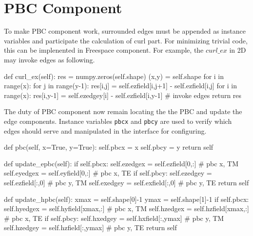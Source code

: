 \section{PBC Component}
To make PBC component work, surrounded edges must be appended as instance variables and participate the calculation of
curl part. For minimizing trivial code, this can be implenented in Freespace component. For example, the $curl\_ex$ in
2D may invoke edges as following.
\begin{code}
    def curl_ex(self):
        res = numpy.zeros(self.shape)
        (x,y) = self.shape
        for i in range(x):
            for j in range(y-1):
                res[i,j] = self.ezfield[i,j+1] - self.ezfield[i,j]
        for i in range(x):
            res[i,y-1] = self.ezedgey[i] - self.ezfield[i,y-1]  # invoke edges
        return res
\end{code}
The duty of PBC component now remain locating the the PBC and update the edge components. Instance variables
\texttt{pbcx} and \texttt{pbcy} are used to verify which edges should serve and manipulated in the interface for
configuring.
\begin{code}
    def pbc(self, x=True, y=True):
        self.pbcx = x
        self.pbcy = y
        return self

    def update_epbc(self):
        if self.pbcx:
            self.ezedgex = self.ezfield[0,:] # pbc x, TM
            self.eyedgex = self.eyfield[0,:] # pbc x, TE
        if self.pbcy:
            self.ezedgey = self.ezfield[:,0] # pbc y, TM
            self.exedgey = self.exfield[:,0] # pbc y, TE
        return self

    def update_hpbc(self):
        xmax = self.shape[0]-1
        ymax = self.shape[1]-1
        if self.pbcx:
            self.hyedgex = self.hyfield[xmax,:] # pbc x, TM
            self.hzedgex = self.hzfield[xmax,:] # pbc x, TE
        if self.pbcy:
            self.hxedgey = self.hxfield[:,ymax] # pbc y, TM
            self.hzedgey = self.hzfield[:,ymax] # pbc y, TE
        return self
\end{code}

